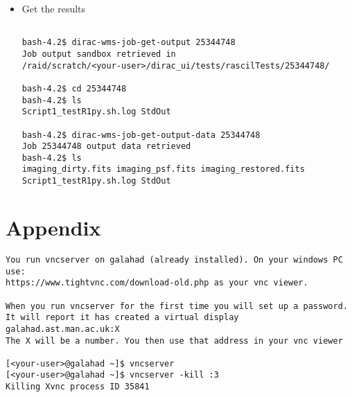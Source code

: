 \documentclass[english]{article}
\begin{document}
\begin{itemize}
\begin{verbatim}
bash-4.2$ python jobpy.py
Submission Result: {'requireProxyUpload': False, 'OK': True, 'rpcStub':
(('WorkloadManagement/JobManag er', {'delegatedDN':
None, 'timeout': 600, 'skipCACheck': False, 'keepAliveLapse': 150,
'delegatedGroup ': None}), 'submitJob', ('[ \n
Origin = DIRAC;\n Executable = "$DIRACROOT/scripts/dirac-jobexec";
\n StdError = StdErr;\n LogLevel = info;\n OutputSE = UKI-NORTHGRIDMAN-
HEP-disk;\n InputSa ndbox = \n {\n
"testR1py.sh",\n "SB:GridPPSandboxSE|/SandBox/i/iulia.c.cim
pan.skatelescope.eu_user/cf8/ca6/cf8ca689995e24c01c068eb6f34126b8.tar.bz2"\n
};\n JobName = T estJob;\n Priority = 1;\n
Arguments = "jobDescription.xml -o LogLevel=info";\n JobGroup = skat
elescope.eu;\n OutputSandbox = \n {\n StdOut,\n
StdErr,\n Sc ript1_testR1py.sh.log\n
};\n StdOutput = StdOut;\n InputData = LFN:/skatelescope.eu/user/c
/<your-user>/rascil/RASCIL-full1.img;\n JobType = User;\n OutputData = \n
{\n imagin g_dirty.fits,\n
imaging_psf.fits,\n imaging_restored.fits\n };\n]',)), 'Va
lue': 25344748, 'JobID': 25344748}
\end{verbatim}

\item Get the results
  \begin{verbatim}

bash-4.2$ dirac-wms-job-get-output 25344748
Job output sandbox retrieved in 
/raid/scratch/<your-user>/dirac_ui/tests/rascilTests/25344748/

bash-4.2$ cd 25344748
bash-4.2$ ls
Script1_testR1py.sh.log StdOut

bash-4.2$ dirac-wms-job-get-output-data 25344748
Job 25344748 output data retrieved
bash-4.2$ ls
imaging_dirty.fits imaging_psf.fits imaging_restored.fits
Script1_testR1py.sh.log StdOut
\end{verbatim}

\end{itemize}

\vspace{7 cm}

\section{Appendix}
 \begin{verbatim}
You run vncserver on galahad (already installed). On your windows PC use:
https://www.tightvnc.com/download-old.php as your vnc viewer.

When you run vncserver for the first time you will set up a password. 
It will report it has created a virtual display galahad.ast.man.ac.uk:X
The X will be a number. You then use that address in your vnc viewer

[<your-user>@galahad ~]$ vncserver
[<your-user>@galahad ~]$ vncserver -kill :3
Killing Xvnc process ID 35841
\end{verbatim}
\end{document}
